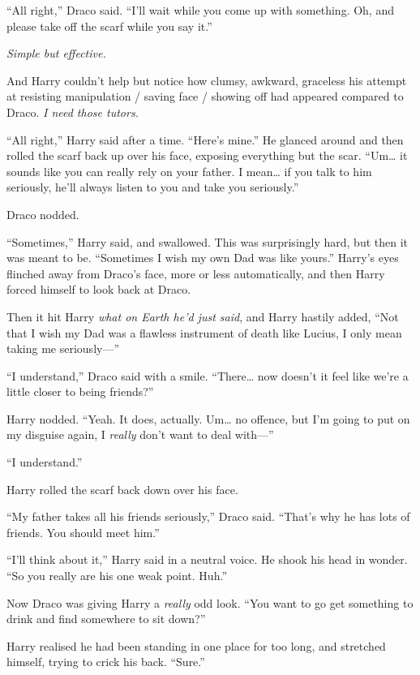 ``All right,'' Draco said. ``I'll wait while you come up with something.
Oh, and please take off the scarf while you say it.''

\emph{Simple but effective.}

And Harry couldn't help but notice how clumsy, awkward, graceless his
attempt at resisting manipulation / saving face / showing off had
appeared compared to Draco. \emph{I need those tutors.}

``All right,'' Harry said after a time. ``Here's mine.'' He glanced
around and then rolled the scarf back up over his face, exposing
everything but the scar. ``Um\ldots{} it sounds like you can really rely
on your father. I mean\ldots{} if you talk to him seriously, he'll
always listen to you and take you seriously.''

Draco nodded.

``Sometimes,'' Harry said, and swallowed. This was surprisingly hard,
but then it was meant to be. ``Sometimes I wish my own Dad was like
yours.'' Harry's eyes flinched away from Draco's face, more or less
automatically, and then Harry forced himself to look back at Draco.

Then it hit Harry \emph{what on Earth he'd just said}, and Harry hastily
added, ``Not that I wish my Dad was a flawless instrument of death like
Lucius, I only mean taking me seriously---''

``I understand,'' Draco said with a smile. ``There\ldots{} now doesn't
it feel like we're a little closer to being friends?''

Harry nodded. ``Yeah. It does, actually. Um\ldots{} no offence, but I'm
going to put on my disguise again, I \emph{really} don't want to deal
with---''

``I understand.''

Harry rolled the scarf back down over his face.

``My father takes all his friends seriously,'' Draco said. ``That's why
he has lots of friends. You should meet him.''

``I'll think about it,'' Harry said in a neutral voice. He shook his
head in wonder. ``So you really are his one weak point. Huh.''

Now Draco was giving Harry a \emph{really} odd look. ``You want to go
get something to drink and find somewhere to sit down?''

Harry realised he had been standing in one place for too long, and
stretched himself, trying to crick his back. ``Sure.''

